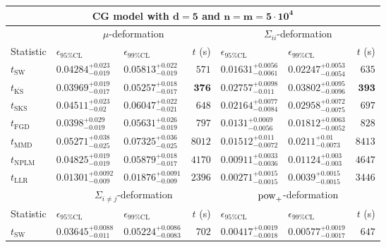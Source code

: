 \begin{tabular}{l|llr|llr}
	\toprule
	\multicolumn{7}{c}{{\bf CG model with $\mathbf{d=5}$ and $\mathbf{n=m=5\cdot 10^{4}}$}} \\
	\toprule
	\multicolumn{1}{c}{} & \multicolumn{3}{c}{$\mu$-deformation} & \multicolumn{3}{c}{$\Sigma_{ii}$-deformation} \\
	Statistic & $\epsilon_{95\%\mathrm{CL}}$ & $\epsilon_{99\%\mathrm{CL}}$ & $t$ (s) & $\epsilon_{95\%\mathrm{CL}}$ & $\epsilon_{99\%\mathrm{CL}}$ & $t$ (s) \\
	\midrule
	$t_{\mathrm{SW}}$ & $0.04284_{-0.019}^{+0.023}$ & $0.05813_{-0.019}^{+0.022}$ & $571$ & $0.01631_{-0.0061}^{+0.0056}$ & $0.02247_{-0.0054}^{+0.0053}$ & $635$ \\
	$t_{\overline{\mathrm{KS}}}$ & ${\mathbf{0.03969_{-0.017}^{+0.019}}}$ & ${\mathbf{0.05257_{-0.017}^{+0.018}}}$ & ${\mathbf{376}}$ & $0.02757_{-0.011}^{+0.0098}$ & $0.03802_{-0.0096}^{+0.0095}$ & ${\mathbf{393}}$ \\
	$t_{\mathrm{SKS}}$ & $0.04511_{-0.02}^{+0.023}$ & $0.06047_{-0.021}^{+0.022}$ & $648$ & $0.02164_{-0.0084}^{+0.0077}$ & $0.02958_{-0.0075}^{+0.0072}$ & $697$ \\
	$t_{\mathrm{FGD}}$ & $0.0398_{-0.019}^{+0.029}$ & $0.05631_{-0.019}^{+0.026}$ & $797$ & ${\mathbf{0.0131_{-0.0056}^{+0.0069}}}$ & ${\mathbf{0.01812_{-0.0052}^{+0.0063}}}$ & $828$ \\
	$t_{\mathrm{MMD}}$ & $0.05271_{-0.025}^{+0.038}$ & $0.07325_{-0.025}^{+0.036}$ & $8012$ & $0.01512_{-0.0072}^{+0.011}$ & $0.0211_{-0.0073}^{+0.01}$ & $8413$ \\
\rowcolor{red!35}	$t_{\mathrm{NPLM}}$ & $0.04825_{-0.019}^{+0.019}$ & $0.05879_{-0.017}^{+0.018}$ & $4170$ & $0.00911_{-0.0036}^{+0.0033}$ & $0.01124_{-0.003}^{+0.003}$ & $4647$ \\
	$t_{\mathrm{LLR}}$ & $0.01301_{-0.009}^{+0.0092}$ & $0.01876_{-0.009}^{+0.0091}$ & $2396$ & $0.00271_{-0.0015}^{+0.0015}$ & $0.0039_{-0.0015}^{+0.0015}$ & $3446$ \\
	\toprule
	\multicolumn{1}{c}{} & \multicolumn{3}{c}{$\Sigma_{i\neq j}$-deformation} & \multicolumn{3}{c}{$\rm{pow}_{+}$-deformation} \\
	Statistic & $\epsilon_{95\%\mathrm{CL}}$ & $\epsilon_{99\%\mathrm{CL}}$ & $t$ (s) & $\epsilon_{95\%\mathrm{CL}}$ & $\epsilon_{99\%\mathrm{CL}}$ & $t$ (s) \\
	\midrule
	$t_{\mathrm{SW}}$ & $0.03645_{-0.011}^{+0.0088}$ & $0.05224_{-0.0083}^{+0.0086}$ & $702$ & $0.00417_{-0.0018}^{+0.0019}$ & $0.00577_{-0.0017}^{+0.0019}$ & $647$ \\

\end{tabular}
